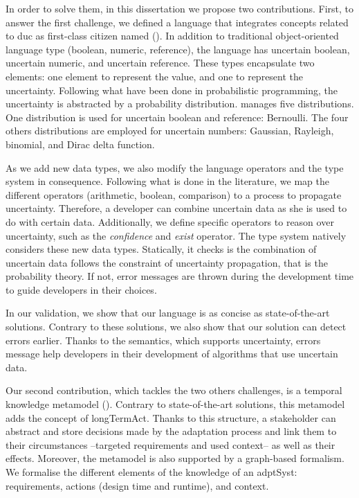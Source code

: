 In order to solve them, in this dissertation we propose two contributions.
First, to answer the first challenge, we defined a language that integrates concepts related to \gls{duc} as first-class citizen named \langName{} (\cf {}).
In addition to traditional object-oriented language type (boolean, numeric, reference), the language has uncertain boolean, uncertain numeric, and uncertain reference.
These types encapsulate two elements: one element to represent the value, and one to represent the uncertainty.
Following what have been done in probabilistic programming, the uncertainty is abstracted by a probability distribution.
\langName{} manages five distributions.
One distribution is used for uncertain boolean and reference: Bernoulli.
The four others distributions are employed for uncertain numbers: Gaussian, Rayleigh, binomial, and Dirac delta function.

As we add new data types, we also modify the language operators and the type system in consequence.
Following what is done in the literature, we map the different operators (arithmetic, boolean, comparison) to a process to propagate uncertainty.
Therefore, a developer can combine uncertain data as she is used to do with certain data.
Additionally, we define specific operators to reason over uncertainty, such as the \textit{confidence} and \textit{exist} operator.
The type system natively considers these new data types.
Statically, it checks is the combination of uncertain data follows the constraint of uncertainty propagation, that is the probability theory.
If not, error messages are thrown during the development time to guide developers in their choices.

In our validation, we show that our language is as concise as state-of-the-art solutions.
Contrary to these solutions, we also show that our solution can detect errors earlier.
Thanks to the semantics, which supports uncertainty, errors message help developers in their development of algorithms that use uncertain data.

Our second contribution, which tackles the two others challenges, is a temporal knowledge \gls{metamodel} (\cf {}).
Contrary to state-of-the-art solutions, this \gls{metamodel} adds the concept of \gls{longTermAct}.
Thanks to this structure, a stakeholder can abstract and store decisions made by the adaptation process and link them to their circumstances --targeted requirements and used context-- as well as their effects. 
Moreover, the \gls{metamodel} is also supported by a graph-based formalism.
We formalise the different elements of the knowledge of an \gls{adptSyst}: \glspl{requirement}, \glspl{action} (design time and runtime), and \gls{context}.

